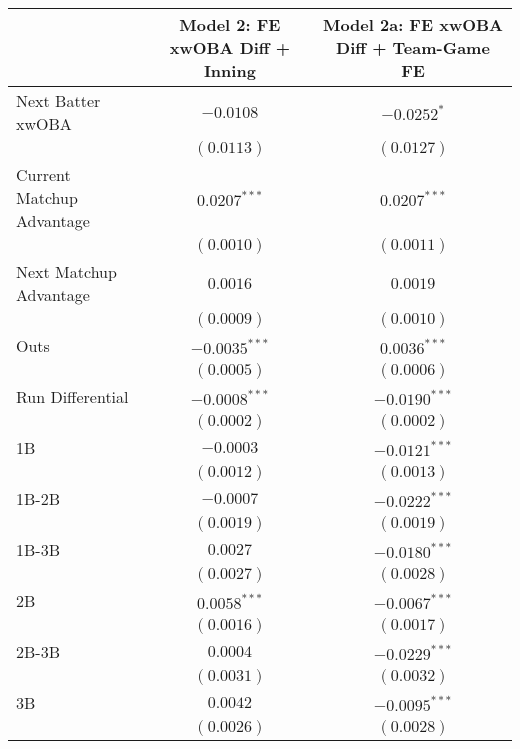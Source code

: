 
\begin{tabular}{l c c}
\toprule
 & Model 2: FE xwOBA Diff + Inning & Model 2a: FE xwOBA Diff + Team-Game FE \\
\midrule
Next Batter xwOBA                & $-0.0108$       & $-0.0252^{*}$   \\
                                 & $(0.0113)$      & $(0.0127)$      \\
Current Matchup Advantage        & $0.0207^{***}$  & $0.0207^{***}$  \\
                                 & $(0.0010)$      & $(0.0011)$      \\
Next Matchup Advantage           & $0.0016$        & $0.0019$        \\
                                 & $(0.0009)$      & $(0.0010)$      \\
Outs                             & $-0.0035^{***}$ & $0.0036^{***}$  \\
                                 & $(0.0005)$      & $(0.0006)$      \\
Run Differential                 & $-0.0008^{***}$ & $-0.0190^{***}$ \\
                                 & $(0.0002)$      & $(0.0002)$      \\
1B                               & $-0.0003$       & $-0.0121^{***}$ \\
                                 & $(0.0012)$      & $(0.0013)$      \\
1B-2B                            & $-0.0007$       & $-0.0222^{***}$ \\
                                 & $(0.0019)$      & $(0.0019)$      \\
1B-3B                            & $0.0027$        & $-0.0180^{***}$ \\
                                 & $(0.0027)$      & $(0.0028)$      \\
2B                               & $0.0058^{***}$  & $-0.0067^{***}$ \\
                                 & $(0.0016)$      & $(0.0017)$      \\
2B-3B                            & $0.0004$        & $-0.0229^{***}$ \\
                                 & $(0.0031)$      & $(0.0032)$      \\
3B                               & $0.0042$        & $-0.0095^{***}$ \\
                                 & $(0.0026)$      & $(0.0028)$      \\

\end{tabular}
